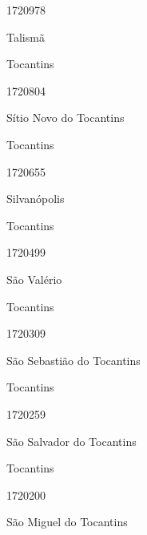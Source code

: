 \documentclass[
  letterpaper,
]{report}
\begin{document}
\n      

1720978

\n      

Talismã

\n    

\n    

\n      

Tocantins

\n      

1720804

\n      

Sítio Novo do Tocantins

\n    

\n    

\n      

Tocantins

\n      

1720655

\n      

Silvanópolis

\n    

\n    

\n      

Tocantins

\n      

1720499

\n      

São Valério

\n    

\n    

\n      

Tocantins

\n      

1720309

\n      

São Sebastião do Tocantins

\n    

\n    

\n      

Tocantins

\n      

1720259

\n      

São Salvador do Tocantins

\n    

\n    

\n      

Tocantins

\n      

1720200

\n      

São Miguel do Tocantins
\end{document}
